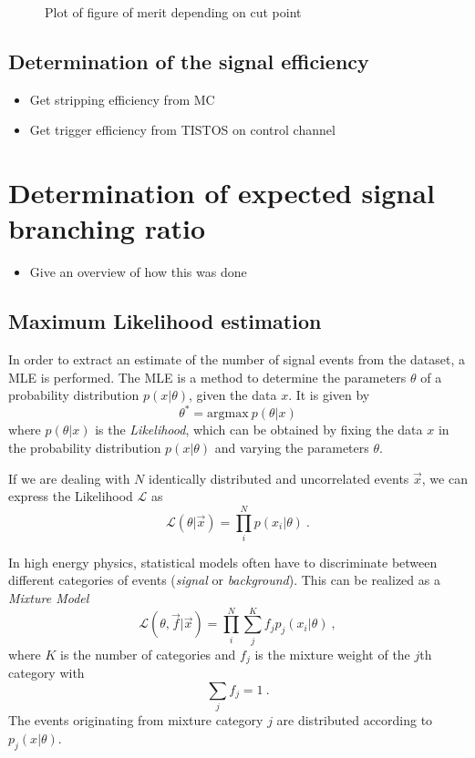 \begin{figure}
  \centering
  \missingfigure[figwidth=\textwidth]{}
  \caption{Plot of figure of merit depending on cut point}
\end{figure}

\section{Determination of the signal efficiency}

\begin{itemize}
  \item Get stripping efficiency from MC
  \item Get trigger efficiency from TISTOS on control channel
\end{itemize}

\chapter{Determination of expected signal branching ratio} %

\begin{itemize}
  \item Give an overview of how this was done
\end{itemize}

\section{Maximum Likelihood estimation}

In order to extract an estimate of the number of signal events from the dataset, a \gls{MLE} is performed.
The \gls{MLE} is a method to determine the parameters $θ$ of a probability distribution $p(x | θ)$, given the data $x$.
It is given by
\begin{equation}
  θ^* = \mathrm{argmax}\ p(θ | x)
  \label{eq:mle}
\end{equation}
where $p(θ | x)$ is the \textit{Likelihood}, which can be obtained by fixing the data $x$ in the probability distribution $p(x | θ)$ and varying the parameters $θ$.

If we are dealing with $N$ identically distributed and uncorrelated events $\vec{x}$, we can express the Likelihood $\mathcal{L}$ as
\begin{equation}
  \mathcal{L}(θ | \vec{x}) = \prod_i^N p(x_i | θ)\:.
\end{equation}

In high energy physics, statistical models often have to discriminate between different categories of events (\eg \textit{signal} or \textit{background}).
This can be realized as a \textit{Mixture Model}
\begin{equation}
  \mathcal{L}(θ, \vec{f} | \vec{x}) = \prod_i^N \sum_j^K f_j p_j(x_i | θ)\:,
\end{equation}
where $K$ is the number of categories and $f_j$ is the mixture weight of the $j$th category with
\begin{equation}
  \sum_j f_j = 1\:.
\end{equation}
The events originating from mixture category $j$ are distributed according to $p_j(x | θ)$.

